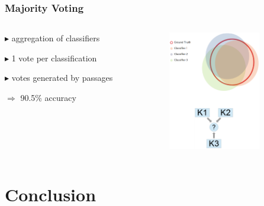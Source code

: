 \documentclass[aspectratio=43]{beamer} 	%
\begin{document}
\begin{frame}
\frametitle{Majority Voting}

\begin{columns}
\begin{column}{6.5cm}
\begin{block}
{$\blacktriangleright$ aggregation of classifiers}
\end{block}
\begin{block}
{$\blacktriangleright$ 1 vote per classification}
\end{block}
\begin{block}
{$\blacktriangleright$ votes generated by passages}
\end{block}

\begin{block}
{\newline $\Rightarrow$ 90.5\% accuracy}
\end{block}
\begin{block}
{}
\end{block}

\end{column}

\begin{column}{3.6cm}
\begin{figure}[!t]
\centering
\includegraphics[height=5.2cm]{majorityvoting.png}
\end{figure}
\begin{block}
{}
\end{block}
\end{column}
\end{columns}

\end{frame}
















\section{Conclusion}
\end{document}

